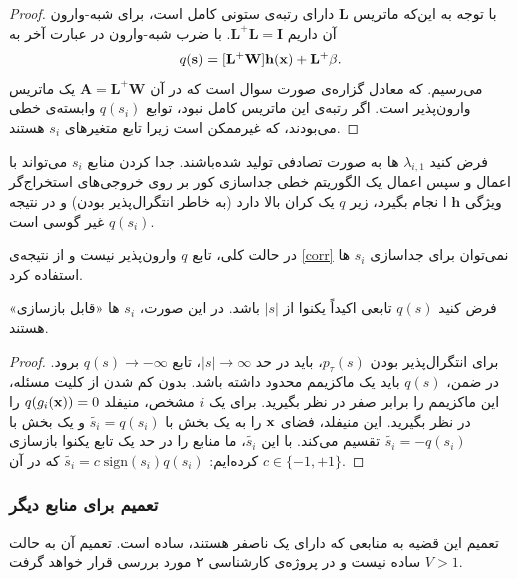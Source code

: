 \begin{proof}
با توجه به این‌که ماتریس
$\mathbf{ L}$
دارای رتبه‌ی ستونی کامل است، برای شبه-وارون آن داریم
$\mathbf{L}^+\mathbf{L} = \mathbf{I}$. 
با ضرب شبه-وارون در عبارت آخر به 
\begin{equation}
q(\mathbf{s})
= [\mathbf{L}^+  \mathbf{W}] \mathbf{h}(\mathbf{x}) + \mathbf{L}^+ \beta.
\end{equation}
می‌رسیم. که معادل گزاره‌ی صورت سوال است که در آن 
$\mathbf{A} = \mathbf{L}^+  \mathbf{W}$
یک ماتریس وارون‌پذیر است. اگر رتبه‌ی این ماتریس کامل نبود، توابع 
$q(s_i)$
وابسته‌ی خطی می‌بودند، که غیرممکن است زیرا تابع متغیر‌های 
$s_i$
هستند.
\end{proof}

\begin{corollary}
فرض‌ کنید
$\lambda_{i, 1}$
ها به صورت تصادفی تولید شده‌باشند. جدا کردن منابع 
$s_i$
می‌تواند با اعمال 
و سپس اعمال یک الگوریتم خطی جداسازی کور بر روی خروجی‌های استخراج‌گر ویژگی
$\mathbf{h}$
ا نجام بگیرد، زیر $q$ یک کران بالا دارد (به خاطر انتگرال‌پذیر بودن) و در نتیجه 
$q(s_i)$
غیر گوسی است.
\label{corr}
\end{corollary}

\begin{note}
در حالت کلی، تابع $q$ وارون‌پذیر نیست و از نتیجه‌ی
\eqref{corr}
  نمی‌توان برای جداسازی 
$s_i$
ها استفاده کرد.
\end{note}
\begin{corollary}
فرض کنید 
$q(s)$
تابعی اکیداً یکنوا از 
$|s|$
باشد. در این صورت،  $s_i$ ها «قابل بازسازی» هستند.
\end{corollary}
\begin{proof}
برای انتگرال‌پذیر بودن
$p_\tau(s)$،
باید در حد
$|s| \to \infty$،
تابع
$q(s) \to -\infty$
برود.  در ضمن،
$q(s)$
باید یک ماکزیمم محدود داشته باشد. بدون کم شدن از کلیت مسئله، این ماکزیمم را برابر صفر در نظر بگیرید. برای یک $i$ مشخص، منیفلد
$q(g_i(\mathbf{x})) = 0$
را در نظر بگیرید. این منیفلد، فضای 
$\mathbf{x}$
را به یک بخش با 
$\tilde{s_i} = q(s_i)$
و یک بخش با 
$\tilde{s_i} = -q(s_i)$
تقسیم می‌کند. با این 
$\tilde{s_i}$،
ما منابع را در حد یک تابع یکنوا بازسازی کرده‌ایم:
$\tilde{s_i} = c \;\mathrm{sign}(s_i)q(s_i)$
که در آن 
$c \in \{-1, +1\}$.
\end{proof}
\subsubsection{تعمیم برای منابع دیگر}
تعمیم این قضیه به منابعی که دارای یک 
ناصفر هستند، ساده است. تعمیم آن به حالت 
$V > 1$
ساده نیست و در پروژه‌ی کارشناسی ۲ مورد بررسی قرار خواهد گرفت.

